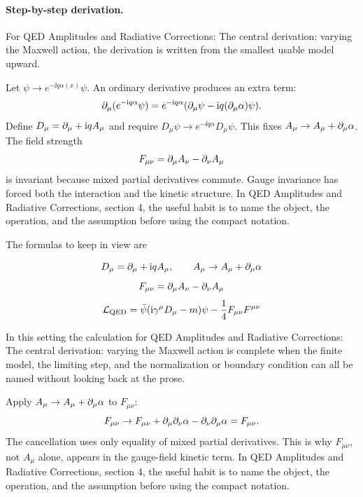 \paragraph{Step-by-step derivation.}

For QED Amplitudes and Radiative Corrections: The central derivation: varying the Maxwell action, the derivation is written from the smallest usable model upward.

Let \(\psi\to e^{-\ii q\alpha(x)}\psi\).  An ordinary derivative produces an extra term:
\[
  \partial_\mu(e^{-\mathrm i q\alpha}\psi)
  =
  e^{-\mathrm i q\alpha}(\partial_\mu\psi-\mathrm i q(\partial_\mu\alpha)\psi).
\]
Define \(D_\mu=\partial_\mu+\mathrm i qA_\mu\) and require \(D_\mu\psi\to e^{-\ii q\alpha}D_\mu\psi\).  This fixes \(A_\mu\to A_\mu+\partial_\mu\alpha\).  The field strength
\[
  F_{\mu\nu}=\partial_\mu A_\nu-\partial_\nu A_\mu
\]
is invariant because mixed partial derivatives commute.  Gauge invariance has forced both the interaction and the kinetic structure.  In QED Amplitudes and Radiative Corrections, section 4, the useful habit is to name the object, the operation, and the assumption before using the compact notation.

The formulas to keep in view are

\[
  D_\mu=\partial_\mu+\mathrm i qA_\mu,\qquad A_\mu\to A_\mu+\partial_\mu\alpha
\]
\[
  F_{\mu\nu}=\partial_\mu A_\nu-\partial_\nu A_\mu
\]
\[
  \mathcal L_{\mathrm{QED}}=\bar\psi(\mathrm i\gamma^\mu D_\mu-m)\psi-\frac14F_{\mu\nu}F^{\mu\nu}
\]

In this setting the calculation for QED Amplitudes and Radiative Corrections: The central derivation: varying the Maxwell action is complete when the finite model, the limiting step, and the normalization or boundary condition can all be named without looking back at the prose.




\begin{example}
Apply \(A_\mu\to A_\mu+\partial_\mu\alpha\) to \(F_{\mu\nu}\):
\[
  F_{\mu\nu}\to F_{\mu\nu}+\partial_\mu\partial_\nu\alpha-\partial_\nu\partial_\mu\alpha=F_{\mu\nu}.
\]
The cancellation uses only equality of mixed partial derivatives.  This is why \(F_{\mu\nu}\), not \(A_\mu\) alone, appears in the gauge-field kinetic term.  In QED Amplitudes and Radiative Corrections, section 4, the useful habit is to name the object, the operation, and the assumption before using the compact notation.
\end{example}



